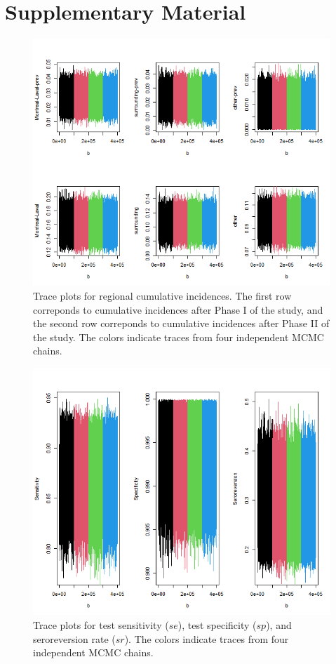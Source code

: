 \section{Supplementary Material}
\captionsetup[subfigure]{labelformat=empty}
\begin{figure}[ht!]
\centering
    \includegraphics[width=\columnwidth]{../../plot/trace_regional.png}
    \caption{Trace plots for regional cumulative incidences. The first row correponds to cumulative incidences after Phase I of the study, and the second row correponds to cumulative incidences after Phase II of the study. The colors indicate traces from four independent MCMC chains.}
    \label{fig:local_trace}
\end{figure}

\captionsetup[subfigure]{labelformat=empty}
\begin{figure}[ht!]
\centering
    \includegraphics[width=\columnwidth]{../../plot/trace_global.png}
    \caption{Trace plots for test sensitivity ($se$), test specificity ($sp$), and seroreversion rate ($sr$). The colors indicate traces from four independent MCMC chains.}
    \label{fig:global_trace}
\end{figure}